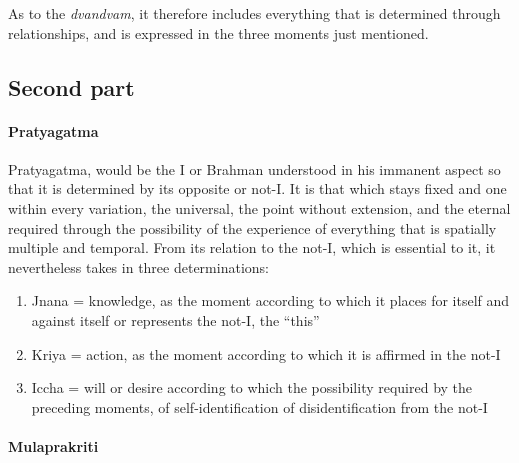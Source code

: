 As to the \emph{dvandvam}, it therefore includes everything that is determined through relationships, and is expressed in the three moments just mentioned.

\subsection*{Second part}


\paragraph{Pratyagatma}


Pratyagatma, would be the I or Brahman understood in his immanent aspect so that it is determined by its opposite or not-I. It is that which stays fixed and one within every variation, the universal, the point without extension, and the eternal required through the possibility of the experience of everything that is spatially multiple and temporal. From its relation to the not-I, which is essential to it, it nevertheless takes in three determinations:

\begin{enumerate}


\item Jnana = knowledge, as the moment according to which it places for itself and against itself or represents the not-I, the ``this''

\item Kriya = action, as the moment according to which it is affirmed in the not-I

\item Iccha = will or desire according to which the possibility required by the preceding moments, of self-identification of disidentification from the not-I
\end{enumerate}


\paragraph{Mulaprakriti}


